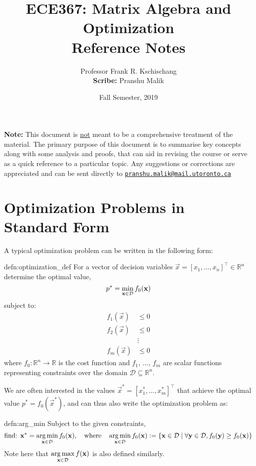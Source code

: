 \documentclass[10pt]{article}
\date{Fall Semester, 2019}
\begin{document}
\title{\textbf{\Large{\textsc{ECE367:} Matrix Algebra and Optimization}} \\ \Large{Reference Notes}\vspace{-0.3cm}}
\author{Professor Frank R. Kschischang\\\small{\textbf{Scribe:} Pranshu Malik}}

\maketitle
\tableofcontents
\blfootnote
{
    \textbf{Note:} This document is \underline{not} meant to be a comprehensive treatment of the material. The primary purpose of this document is to summarise key concepts along with some analysis and proofs, that can aid in revising the course or serve as a quick reference to a particular topic. Any suggestions or corrections are appreciated and can be sent directly to \texttt{\href{mailto:pranshu.malik@mail.utoronto.ca}{pranshu.malik@mail.utoronto.ca}}
}

\pagebreak

\section{Optimization Problems in Standard Form}

A typical optimization problem can be written in the following form:\\
\begin{defn}{defn:optimization_def}
    For a vector of decision variables $\vec{x} = [x_1, \ldots, x_n]^\top \in \mathbb{R}^n$ determine the optimal value,
    \[
        p^* = \min_{\vec{x} \in \mathcal{D}} f_0(\vec{x})\\
    \]
    subject to: 
    \begin{align*}
        f_1(\vec{x}) &\leq 0\\
        f_2(\vec{x}) &\leq 0\\
        &\vdots\\
        f_m(\vec{x}) &\leq 0
    \end{align*}
    where $f_0: \mathbb{R}^n \to \mathbb{R}$ is the cost function and $f_1$, $\ldots$, $f_m$ are scalar functions representing constraints over the domain $\mathcal{D}\subseteq \mathbb{R}^n$.
\end{defn}

We are often interested in the values $\vec{x}^* = [x_1^*, \ldots, x_m^*]^\top$ that achieve the optimal value $p^* = f_0(\vec{x}^*)$, and can thus also write the optimization problem as:\\
\begin{defn}{defn:arg_min}
    Subject to the given constraints, 
    \[
        \text{find: } \vec{x}^* = \argmin_{\vec{x} \in \mathcal{D}} f_0(\vec{x}), \quad \text{where} \quad \argmin_{\vec{x} \in \mathcal{D}} f_0(\vec{x}) := \{\vec{x} \in \mathcal{D} \mid \forall \vec{y} \in \mathcal{D}, f_0(\vec{y}) \geq f_0(\vec{x})\}
    \]
    Note here that $\displaystyle{\argmax_{\vec{x} \in \mathcal{D}} f(\vec{x})}$ is also defined similarly.
\end{defn}
\end{document}
